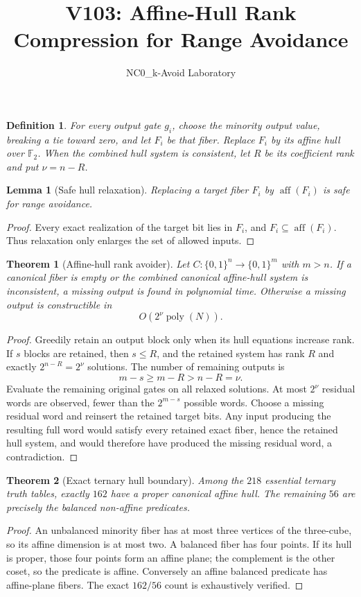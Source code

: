 \documentclass[11pt]{article}
\title{V103: Affine-Hull Rank Compression for Range Avoidance}
\author{NC0\_k-Avoid Laboratory}
\date{}
\newtheorem{theorem}{Theorem}
\newtheorem{lemma}{Lemma}
\newtheorem{definition}{Definition}
\begin{document}
\maketitle

\begin{definition}
For every output gate $g_i$, choose the minority output value, breaking a tie
toward zero, and let $F_i$ be that fiber. Replace $F_i$ by its affine hull over
$\mathbb F_2$. When the combined hull system is consistent, let $R$ be its
coefficient rank and put $\nu=n-R$.
\end{definition}

\begin{lemma}[Safe hull relaxation]
Replacing a target fiber $F_i$ by $\operatorname{aff}(F_i)$ is safe for range
avoidance.
\end{lemma}
\begin{proof}
Every exact realization of the target bit lies in $F_i$, and
$F_i\subseteq\operatorname{aff}(F_i)$. Thus relaxation only enlarges the set of
allowed inputs.
\end{proof}

\begin{theorem}[Affine-hull rank avoider]
Let $C:\{0,1\}^n\to\{0,1\}^m$ with $m>n$. If a canonical fiber is empty or the
combined canonical affine-hull system is inconsistent, a missing output is found
in polynomial time. Otherwise a missing output is constructible in
\[
O(2^\nu\operatorname{poly}(N)).
\]
\end{theorem}
\begin{proof}
Greedily retain an output block only when its hull equations increase rank. If
$s$ blocks are retained, then $s\le R$, and the retained system has rank $R$
and exactly $2^{n-R}=2^\nu$ solutions. The number of remaining outputs is
\[
m-s\ge m-R>n-R=\nu.
\]
Evaluate the remaining original gates on all relaxed solutions. At most
$2^\nu$ residual words are observed, fewer than the $2^{m-s}$ possible words.
Choose a missing residual word and reinsert the retained target bits. Any input
producing the resulting full word would satisfy every retained exact fiber,
hence the retained hull system, and would therefore have produced the missing
residual word, a contradiction.
\end{proof}

\begin{theorem}[Exact ternary hull boundary]
Among the $218$ essential ternary truth tables, exactly $162$ have a proper
canonical affine hull. The remaining $56$ are precisely the balanced non-affine
predicates.
\end{theorem}
\begin{proof}
An unbalanced minority fiber has at most three vertices of the three-cube, so
its affine dimension is at most two. A balanced fiber has four points. If its
hull is proper, those four points form an affine plane; the complement is the
other coset, so the predicate is affine. Conversely an affine balanced
predicate has affine-plane fibers. The exact $162/56$ count is exhaustively
verified.
\end{proof}
\end{document}
